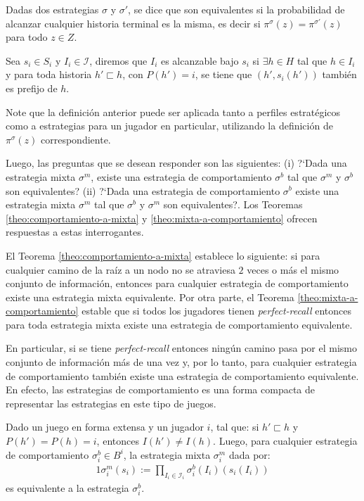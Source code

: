 \begin{definition}
\label{def:equivalencia-estrategias}
Dadas dos estrategias $\sigma$ y $\sigma'$, se dice que son equivalentes si la probabilidad de alcanzar cualquier historia terminal es la misma, es decir si $\pi^\sigma(z) = \pi^{\sigma'}(z)$ para todo $z \in Z$.
\end{definition}

\begin{definition}
\label{def:alcanzabilidad-historia}
Sea $s_i \in S_i$ y $I_i \in \mathcal{I}$, diremos que $I_i$ es alcanzable bajo $s_i$ si $\exists h \in H$ tal que $h \in I_i$ y para toda historia $h' \sqsubset h$, con $P(h') = i$, se tiene que $(h', s_i(h'))$ también es prefijo de $h$.  
\end{definition}

Note que la definición anterior puede ser aplicada tanto a perfiles estratégicos como a estrategias para un jugador en particular, utilizando la definición de $\pi^{\sigma}(z)$ correspondiente.

Luego, las preguntas que se desean responder son las siguientes: (i) ?`Dada una estrategia mixta $\sigma^m$, existe una estrategia de comportamiento $\sigma^b$ tal que $\sigma^m$ y $\sigma^b$ son equivalentes? (ii) ?`Dada una estrategia de comportamiento $\sigma^b$ existe una estrategia mixta $\sigma^m$ tal que $\sigma^b$ y $\sigma^m$ son equivalentes?. Los Teoremas \ref{theo:comportamiento-a-mixta} y \ref{theo:mixta-a-comportamiento} ofrecen respuestas a estas interrogantes.

El Teorema \ref{theo:comportamiento-a-mixta} establece lo siguiente: si para cualquier camino de la raíz a un nodo no se atraviesa $2$ veces o más el mismo conjunto de información, entonces para cualquier estrategia de comportamiento existe una estrategia mixta equivalente. Por otra parte, el Teorema \ref{theo:mixta-a-comportamiento} estable que si todos los jugadores tienen \textit{perfect-recall} entonces para toda estrategia mixta existe una estrategia de comportamiento equivalente.

En particular, si se tiene \textit{perfect-recall} entonces ningún camino pasa por el mismo conjunto de información más de una vez y, por lo tanto, para cualquier estrategia de comportamiento también existe una estrategia de comportamiento equivalente. En efecto, las estrategias de comportamiento es una forma compacta de representar las estrategias en este tipo de juegos.

\begin{theorem}
\label{theo:comportamiento-a-mixta}
Dado un juego en forma extensa y un jugador $i$, tal que: si $h' \sqsubset h$ y $P(h') = P(h) = i$, entonces $I(h') \neq I(h)$. Luego, para cualquier estrategia de comportamiento $\sigma^b_i \in B^i$, la estrategia mixta $\sigma^m_i$ dada por:
\begin{alignat}{1}
\sigma^m_i(s_i) := \prod_{I_i \in \mathcal{I}_i} \sigma^b_i(I_i)(s_i(I_i)) \label{eq:comportamiento-a-mixta}
\end{alignat}
es equivalente a la estrategia $\sigma^b_i$.
\end{theorem}

